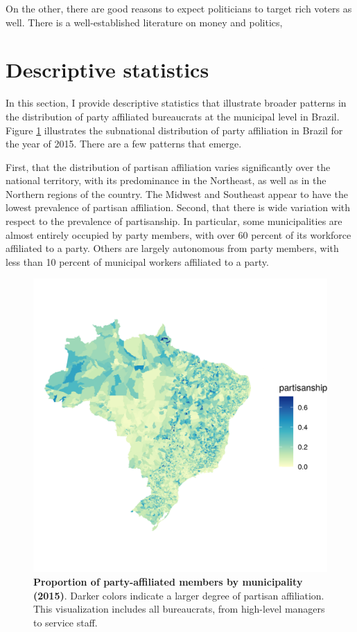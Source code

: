 \documentclass[12pt,a4paper]{article}
\begin{document}
On the other, there are good reasons to expect politicians to target rich voters as well. There is a well-established literature on money and politics, 

\section{Descriptive statistics}
\label{sec:descriptive}

In this section, I provide descriptive statistics that illustrate broader patterns in the distribution of party affiliated bureaucrats at the municipal level in Brazil. Figure \ref{fig:map_pooled} illustrates the subnational distribution of party affiliation in Brazil for the year of 2015. There are a few patterns that emerge.

First, that the distribution of partisan affiliation varies significantly over the national territory, with its predominance in the Northeast, as well as in the Northern regions of the country. The Midwest and Southeast appear to have the lowest prevalence of partisan affiliation. Second, that there is wide variation with respect to the prevalence of partisanship. In particular, some municipalities are almost entirely occupied by party members, with over 60 percent of its workforce affiliated to a party. Others are largely autonomous from party members, with less than 10 percent of municipal workers affiliated to a party.

\begin{figure}[H]
    \centering
    \includegraphics{figures/maps/pooled.png}
    \caption{\textbf{Proportion of party-affiliated members by municipality (2015)}. Darker colors indicate a larger degree of partisan affiliation. This visualization includes all bureaucrats, from high-level managers to service staff.}
    \label{fig:map_pooled}
\end{figure}
\end{document}
